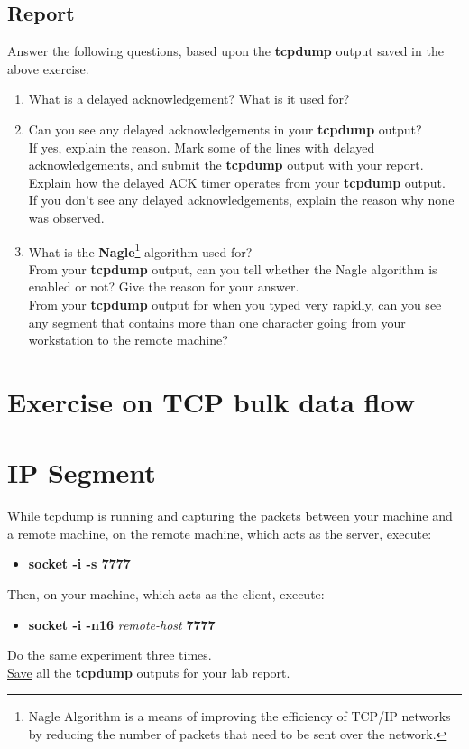 \documentclass[10pt,a4paper]{article}
\numberwithin{equation}{section}
\numberwithin{figure}{section}
\numberwithin{table}{section}
\begin{document}
    \subsection*{Report}
    Answer the following questions, based upon the \textbf{tcpdump} output saved in the above exercise.
    \begin{enumerate}
        \item What is a delayed acknowledgement?
        What is it used for?
        \item Can you see any delayed acknowledgements in your \textbf{tcpdump} output? \\
        If yes, explain the reason.
        Mark some of the lines with delayed acknowledgements, and submit the \textbf{tcpdump} output with your report. \\
        Explain how the delayed ACK timer operates from your \textbf{tcpdump} output. \\
        If you don’t see any delayed acknowledgements, explain the reason why none was observed.
        \item What is the \textbf{Nagle}\footnote{Nagle Algorithm is a means of improving the efficiency of TCP/IP networks by reducing the number of packets that need to be sent over the network.} algorithm used for? \\
        From your \textbf{tcpdump} output, can you tell whether the Nagle algorithm is enabled or not? Give the reason for your answer.\\
        From your \textbf{tcpdump} output for when you typed very rapidly, can you see any segment that contains more than one character going from your workstation to the remote machine?
    \end{enumerate}

\section*{Exercise on TCP bulk data flow}
\section{IP Segment}
    While tcpdump is running and capturing the packets between your machine and a remote machine, on the remote machine, which acts as the server, execute:
    \begin{itemize}
        \item \textbf{socket -i -s 7777}
    \end{itemize}
    Then, on your machine, which acts as the client, execute:
    \begin{itemize}
        \item \textbf{socket -i -n16} \textit{remote-host} \textbf{7777}
    \end{itemize}
    Do the same experiment three times. \\
    \underline{Save} all the \textbf{tcpdump} outputs for your lab report.
\end{document}
